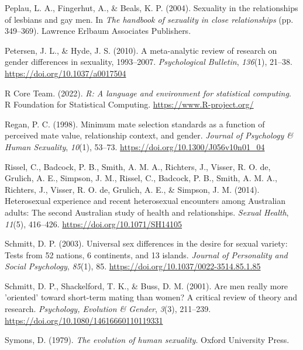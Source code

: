\documentclass[
  11pt,
]{article}
\newlength{\cslhangindent}
\newlength{\cslentryspacingunit} %
\newenvironment{CSLReferences}[2] %
 {%
  \setlength{\parindent}{0pt}
  \ifodd #1
  \let\oldpar\par
  \def\par{\hangindent=\cslhangindent\oldpar}
  \fi
  \setlength{\parskip}{#2\cslentryspacingunit}
 }%
 {}
\begin{document}
\begin{CSLReferences}{1}{0}
\leavevmode{}%
Peplau, L. A., Fingerhut, A., \& Beals, K. P. (2004). Sexuality in the
relationships of lesbians and gay men. In \emph{The handbook of
sexuality in close relationships} (pp. 349--369). Lawrence Erlbaum
Associates Publishers.

\leavevmode{}%
Petersen, J. L., \& Hyde, J. S. (2010). A meta-analytic review of
research on gender differences in sexuality, 1993--2007.
\emph{Psychological Bulletin}, \emph{136}(1), 21--38.
\url{https://doi.org/10.1037/a0017504}

\leavevmode{}%
R Core Team. (2022). \emph{R: A language and environment for statistical
computing}. R Foundation for Statistical Computing.
\url{https://www.R-project.org/}

\leavevmode{}%
Regan, P. C. (1998). Minimum mate selection standards as a function of
perceived mate value, relationship context, and gender. \emph{Journal of
Psychology \& Human Sexuality}, \emph{10}(1), 53--73.
\url{https://doi.org/10.1300/J056v10n01_04}

\leavevmode{}%
Rissel, C., Badcock, P. B., Smith, A. M. A., Richters, J., Visser, R. O.
de, Grulich, A. E., Simpson, J. M., Rissel, C., Badcock, P. B., Smith,
A. M. A., Richters, J., Visser, R. O. de, Grulich, A. E., \& Simpson, J.
M. (2014). Heterosexual experience and recent heterosexual encounters
among {A}ustralian adults: The second {A}ustralian study of health and
relationships. \emph{Sexual Health}, \emph{11}(5), 416--426.
\url{https://doi.org/10.1071/SH14105}

\leavevmode{}%
Schmitt, D. P. (2003). Universal sex differences in the desire for
sexual variety: Tests from 52 nations, 6 continents, and 13 islands.
\emph{Journal of Personality and Social Psychology}, \emph{85}(1), 85.
\url{https://doi.org/10.1037/0022-3514.85.1.85}

\leavevmode{}%
Schmitt, D. P., Shackelford, T. K., \& Buss, D. M. (2001). Are men
really more 'oriented' toward short-term mating than women? A critical
review of theory and research. \emph{Psychology, Evolution \& Gender},
\emph{3}(3), 211--239. \url{https://doi.org/10.1080/14616660110119331}

\leavevmode{}%
Symons, D. (1979). \emph{The evolution of human sexuality}. Oxford
University Press.


\end{CSLReferences}
\end{document}
